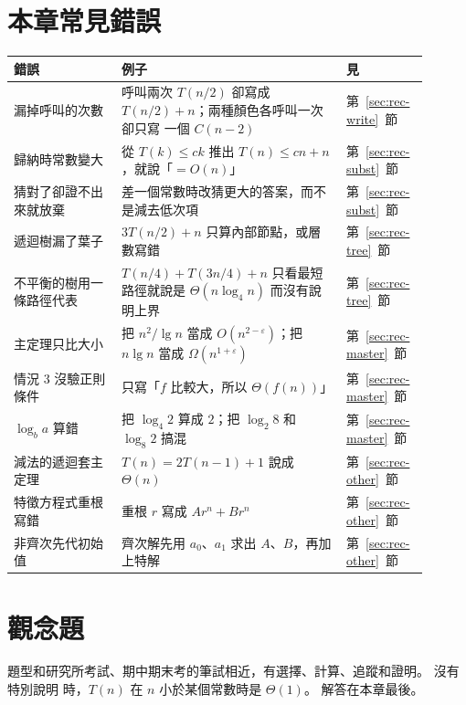 \section{本章常見錯誤}
\label{sec:rec-pitfalls}

\begin{center}
\begin{tabular}{>{\raggedright\arraybackslash}p{0.24\linewidth}>{\raggedright\arraybackslash}p{0.50\linewidth}p{0.16\linewidth}}
\toprule
錯誤 & 例子 & 見 \\
\midrule
漏掉呼叫的次數 & 呼叫兩次 $T(n/2)$ 卻寫成 $T(n/2) + n$；兩種顏色各呼叫一次卻只寫
一個 $C(n-2)$ & 第~\ref{sec:rec-write}~節 \\
歸納時常數變大 & 從 $T(k) \le ck$ 推出 $T(n) \le cn + n$，就說「$= O(n)$」 &
第~\ref{sec:rec-subst}~節 \\
猜對了卻證不出來就放棄 & 差一個常數時改猜更大的答案，而不是減去低次項 &
第~\ref{sec:rec-subst}~節 \\
遞迴樹漏了葉子 & $3T(n/2) + n$ 只算內部節點，或層數寫錯 &
第~\ref{sec:rec-tree}~節 \\
不平衡的樹用一條路徑代表 & $T(n/4) + T(3n/4) + n$ 只看最短路徑就說是
$\Theta(n \log_4 n)$ 而沒有說明上界 & 第~\ref{sec:rec-tree}~節 \\
主定理只比大小 & 把 $n^2/\lg n$ 當成 $O(n^{2 - \varepsilon})$；把 $n \lg n$ 當成
$\Omega(n^{1+\varepsilon})$ & 第~\ref{sec:rec-master}~節 \\
情況 3 沒驗正則條件 & 只寫「$f$ 比較大，所以 $\Theta(f(n))$」 &
第~\ref{sec:rec-master}~節 \\
$\log_b a$ 算錯 & 把 $\log_4 2$ 算成 $2$；把 $\log_2 8$ 和 $\log_8 2$ 搞混 &
第~\ref{sec:rec-master}~節 \\
減法的遞迴套主定理 & $T(n) = 2T(n-1) + 1$ 說成 $\Theta(n)$ &
第~\ref{sec:rec-other}~節 \\
特徵方程式重根寫錯 & 重根 $r$ 寫成 $A r^n + B r^n$ & 第~\ref{sec:rec-other}~節 \\
非齊次先代初始值 & 齊次解先用 $a_0$、$a_1$ 求出 $A$、$B$，再加上特解 &
第~\ref{sec:rec-other}~節 \\
\bottomrule
\end{tabular}
\end{center}

\section{觀念題}
\label{sec:rec-exercises}

題型和研究所考試、期中期末考的筆試相近，有選擇、計算、追蹤和證明。 沒有特別說明
時，$T(n)$ 在 $n$ 小於某個常數時是 $\Theta(1)$。 解答在本章最後。

